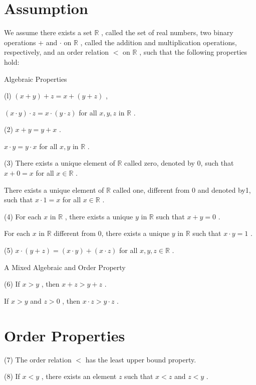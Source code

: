 \section*{Assumption}

We assume there exists a set \(\mathbb{R}\) , called the set of real numbers, two binary operations + and \(\cdot\) on \(\mathbb{R}\) , called the addition and multiplication operations, respectively, and an order relation \(<\) on \(\mathbb{R}\) , such that the following properties hold:

Algebraic Properties

(l) \(\left( {x + y}\right)  + z = x + \left( {y + z}\right)\) ,

\(\left( {x \cdot  y}\right)  \cdot  z = x \cdot  \left( {y \cdot  z}\right)\) for all \(x,y,z\) in \(\mathbb{R}\) .

(2) \(x + y = y + x\) .

\(x \cdot  y = y \cdot  x\) for all \(x,y\) in \(\mathbb{R}\) .

(3) There exists a unique element of \(\mathbb{R}\) called zero, denoted by 0, such that \(x + 0 = x\) for all \(x \in  \mathbb{R}\) .

There exists a unique element of \(\mathbb{R}\) called one, different from 0 and denoted by1, such that \(x \cdot  1 = x\) for all \(x \in  \mathbb{R}\) .

(4) For each \(x\) in \(\mathbb{R}\) , there exists a unique \(y\) in \(\mathbb{R}\) such that \(x + y = 0\) .

For each \(x\) in \(\mathbb{R}\) different from 0, there exists a unique \(y\) in \(\mathbb{R}\) such that \(x \cdot  y = 1\) .

(5) \(x \cdot  \left( {y + z}\right)  = \left( {x \cdot  y}\right)  + \left( {x \cdot  z}\right)\) for all \(x,y,z \in  \mathbb{R}\) .

A Mixed Algebraic and Order Property

(6) If \(x > y\) , then \(x + z > y + z\) .

If \(x > y\) and \(z > 0\) , then \(x \cdot  z > y \cdot  z\) .

\section*{Order Properties}

(7) The order relation \(<\) has the least upper bound property.

(8) If \(x < y\) , there exists an element \(z\) such that \(x < z\) and \(z < y\) .

